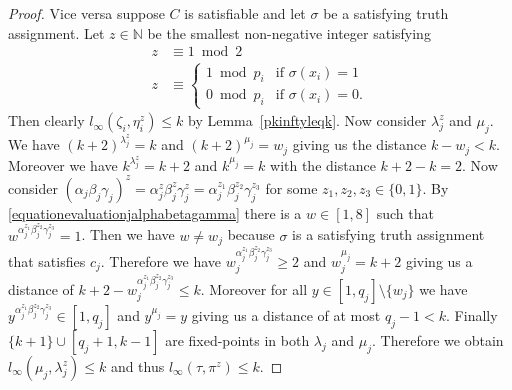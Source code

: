 \documentclass{article}
\begin{document}
\begin{proof}
Vice versa suppose $C$ is satisfiable and let $\sigma$ be a satisfying truth assignment. Let $z \in \mathbb{N}$ be the smallest non-negative integer satisfying
\begin{align*}
z &\equiv 1 \bmod 2\\
z &\equiv \begin{cases}
1 \bmod p_i & \text{if } \sigma(x_i)=1\\
0 \bmod p_i & \text{if } \sigma(x_i)=0.
\end{cases}
\end{align*}
Then clearly $l_\infty(\zeta_i,\eta_i^z) \leq k$ by Lemma~\ref{pkinftyleqk}. Now consider $\lambda_j^z$ and $\mu_j$. We have $(k+2)^{\lambda_j^z} = k$ and $(k+2)^{\mu_j} = w_j$ giving us the distance $k-w_j < k$. Moreover we have $k^{\lambda_j^z} = k+2$ and $k^{\mu_j} = k$ with the distance $k+2-k = 2$. Now consider $(\alpha_j\beta_j\gamma_j)^z = \alpha_j^z\beta_j^z\gamma_j^z = \alpha_j^{z_1}\beta_j^{z_2}\gamma_j^{z_3}$ for some $z_1,z_2,z_3 \in \{0,1\}$. By \eqref{equationevaluationjalphabetagamma} there is a $w \in [1,8]$ such that $w^{\alpha_j^{z_1}\beta_j^{z_2}\gamma_j^{z_3}} = 1$. Then we have $w \neq w_j$ because $\sigma$ is a satisfying truth assignment that satisfies $c_j$. Therefore we have $w_j^{\alpha_j^{z_1}\beta_j^{z_2}\gamma_j^{z_3}} \geq 2$ and $w_j^{\mu_j} = k+2$ giving us a distance of $k+2-w_j^{\alpha_j^{z_1}\beta_j^{z_2}\gamma_j^{z_3}} \leq k$. Moreover for all $y \in [1,q_j] \setminus \{w_j\}$ we have $y^{\alpha_j^{z_1}\beta_j^{z_2}\gamma_j^{z_3}} \in [1,q_j]$ and $y^{\mu_j} = y$ giving us a distance of at most $q_j-1 < k$. Finally $\{k+1\} \cup [q_j+1,k-1]$ are fixed-points in both $\lambda_j$ and $\mu_j$. Therefore we obtain $l_\infty(\mu_j,\lambda_j^z) \leq k$ and thus $l_\infty(\tau,\pi^z) \leq k$.
\end{proof}
\end{document}
